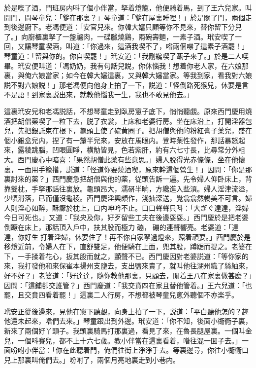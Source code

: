 於是喫了酒，門班房内呌了個小伴當，拏着燈籠，他便騎着馬，到了王六兒家。叫開門，問琴童兒：「爹在那裏？」琴童道：「爹在屋裏睡哩！」於是關了門，兩個走到後邊廚下。老馮便道：「安官兒來。你韓大嬸只顧等你不見來，替你留下分兒了。」向廚櫃裏拏了一盤驢肉，一碟臘燒鷄，兩碗壽麵，一素子酒。玳安喫了一回，又讓琴童喫酒，叫道：「你過來，這酒我喫不了，喒兩個噤了這素子酒罷！」琴童道：「留與你的。你自喫罷！」玳安道：「我剛纔喫了甌子來了。」於是二人喫畢。玳安便叫道：「馮奶奶，我有句話兒説，你休惱我！想着你老人家，在六娘那裏，與俺六娘當家；如今在韓大嬸這裏，又與韓大嬸當家。等我到家，看我對六娘説不對六娘説！」那老馮便向他身上拍了一下，説道：「怪倒路死猴兒，休要是言不是語！到家裏説出來，就教他惱我一生，我也不敢見他去。」

這裏玳安兒和老馮説話，不想琴童走到臥房窻子底下，悄悄聽覷。原來西門慶用燒酒把胡僧薬喫了一粒下去，脱了衣裳，上床和老婆行房。坐在床沿上，打開淫器包兒，先把銀託束在根下，龜頭上使了硫黄圈子。把胡僧與他的粉紅膏子薬兒，盛在個小銀盒兒内，捏了有一釐半兒來，安放在馬眼内。登時薬性發作，那話暴怒起來，露稜跳腦，凹眼圓睜，横觔皆見，色若紫肝，約有六七寸長，比尋常分外粗大。西門慶心中暗喜：「果然胡僧此薬有些意思。」婦人脱得光赤條條，坐在他懷裏，一面用手籠揝，説道：「怪道你要燒酒喫，原來幹這個營生！」因問：「你是那裏討來的薬？」西門慶急把胡僧與他的薬，従頭告訴一遍。先令婦人仰卧床上，背靠雙枕，手拏那話往裏放。龜頭昂大，濡硏半晌，方纔進入些湏。婦人淫津流溢，少頃滑落，已而僅沒龜稜。西門慶淫興頗作，淺抽深送，覺翕翕然暢美不可言。婦人則淫心如醉，酥癱於枕上，口内呻吟不止。口口聲聲只呌：「大ぎぐ達達，淫婦今日可死也。」又道：「我央及你，好歹留些工夫在後邊耍耍。」西門慶於是把老婆倒蹶在床上，那話頂入戶中，扶其股而極力𢵞磞，𢵞磞的連聲響亮。老婆道：「達達，你好生𢵞打着淫婦，休要住了！再不你自家拏過燈來，照着頑耍。」西門慶於是移燈近前，令婦人在下，直舒雙足，他便騎在上面，兜其股，蹲踞而提之。老婆在下，一手揉着花心，扳其股而就之，顫聲不已。西門慶因對老婆説道：「等你家的來，我打發他和來保崔本揚州支鹽去，支出鹽來賣了，就叫他往湖州織了絲紬來，好不好？」老婆道：「好達達，隨你教他那裏，只顧去，閒着王八在家裏做甚麽？」因問：「這鋪卻交誰管？」西門慶道：「我交賁四在家且替他管着。」王六兒道：「也罷，且交賁四看着罷！」這裏二人行房，不想都被琴童兒窻外聽個不亦楽乎。

玳安正從後邊來，見他在窻下聽覷，向身上拍了一下，説道：「平白聽他怎的？趂他還未起來，喒們去來。」琴童跟出到外邊。玳安道：「你不知，後面小衚衕子裏，新來了兩個好丫頭子。我頭裏騎馬打那裏過，看見了來，在魯長腿屋裏。一個叫金兒，一個呌賽兒，都不上十六七歲。教小伴當在這裏看着，喒往混一囬子去。」一面吩咐小伴當：「你在此聽着門，俺們往街上淨淨手去。等裏邊尋，你往小衚衕口兒上那裏叫俺們去。」吩咐了，兩個月亮地裏走到小巷内。

